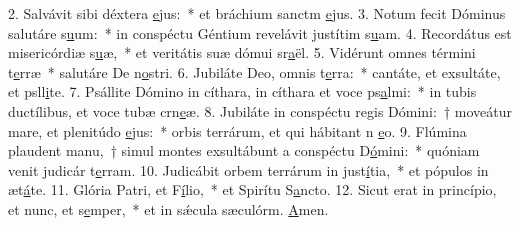 2. Salvávit sibi déxtera \uline{e}jus:~* et bráchium sanctm \uline{e}jus.
3. Notum fecit Dóminus salutáre s\uline{u}um:~* in conspéctu Géntium revelávit justítim s\uline{u}am.
4. Recordátus est misericórdiæ s\uline{u}æ,~* et veritátis suæ dómui sr\uline{a}ël.
5. Vidérunt omnes términi t\uline{e}rræ~* salutáre De n\uline{o}stri.
6. Jubiláte Deo, omnis t\uline{e}rra:~* cantáte, et exsultáte, et psll\uline{i}te.
7. Psállite Dómino in cíthara, in cíthara et voce ps\uline{a}lmi:~* in tubis ductílibus, et voce tubæ crn\uline{e}æ.
8. Jubiláte in conspéctu regis Dómini:~† moveátur mare, et plenitúdo \uline{e}jus:~* orbis terrárum, et qui hábitant n \uline{e}o.
9. Flúmina plaudent manu,~† simul montes exsultábunt a conspéctu D\uline{ó}mini:~* quóniam venit judicár t\uline{e}rram.
10. Judicábit orbem terrárum in just\uline{í}tia,~* et pópulos in æt\uline{á}te.
11. Glória Patri, et F\uline{í}lio,~* et Spirítu S\uline{a}ncto.
12. Sicut erat in princípio, et nunc, et s\uline{e}mper,~* et in sǽcula sæculórm. \uline{A}men.
